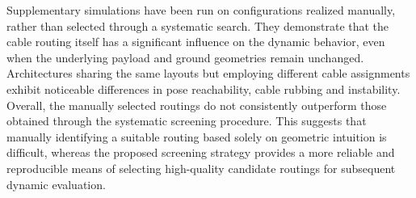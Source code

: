 Supplementary simulations have been run on configurations realized manually, rather than selected through a systematic search. They demonstrate that the cable routing itself has a significant influence on the dynamic behavior, even when the underlying payload and ground geometries remain unchanged. Architectures sharing the same layouts but employing different cable assignments exhibit noticeable differences in pose reachability, cable rubbing and instability. Overall, the manually selected routings do not consistently outperform those obtained through the systematic screening procedure. This suggests that manually identifying a suitable routing based solely on geometric intuition is difficult, whereas the proposed screening strategy provides a more reliable and reproducible means of selecting high-quality candidate routings for subsequent dynamic evaluation.

\begin{table}[htbp]
\centering
\begin{threeparttable}
\caption{Top five manual architectures}
\label{tab:architecture_ranking_manual}

\end{threeparttable}
\end{table}

